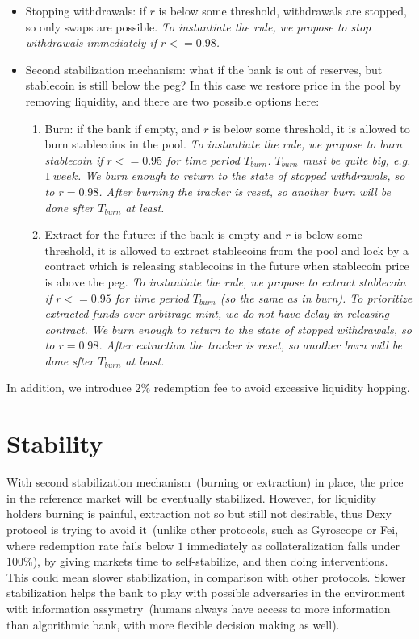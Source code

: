 \documentclass{article}   %
\newcommand{\sct}{stablecoin}
\newcommand{\dx}{Dexy}
\begin{document}
\begin{itemize}
   \item{Stopping withdrawals: } if $r$ is below some threshold, withdrawals are stopped, so only swaps are possible.  
   \em{To instantiate the rule, we propose to stop withdrawals immediately if $r <= 0.98$.}

   \item{Second stabilization mechanism: } what if the bank is out of reserves, but \sct{} is still below the peg? In this case we restore price in the pool by removing liquidity, and there are two possible options here:

   \begin{enumerate}
   \item{Burn: } if the bank if empty, and $r$ is below some threshold, it is allowed to burn \sct{}s in the pool. 
   \em{To instantiate the rule, we propose to burn \sct{} if $r <= 0.95$ for time period $T_{burn}$. $T_{burn}$ must be quite big, e.g. $1 {\ week}$. We burn enough to return to the state of stopped withdrawals, so to $r = 0.98$. After burning the tracker is reset, so another burn will be done sfter $T_{burn}$ at least.}

   \item{Extract for the future: } if the bank is empty and $r$ is below some threshold, it is allowed to extract \sct{}s from the pool and lock by a contract which is releasing \sct{}s in the future when \sct{} price is above the peg.
   \em{To instantiate the rule, we propose to extract \sct{} if $r <= 0.95$ for time period $T_{burn}$ (so the same as in burn). 
   To prioritize extracted funds over arbitrage mint, we do not have delay in releasing contract. We burn enough to return to the state of stopped withdrawals, so to $r = 0.98$. After extraction the tracker is reset, so another burn will be done sfter $T_{burn}$ at least.}
   \end{enumerate}
\end{itemize} 

In addition, we introduce $2\%$ redemption fee to avoid excessive liquidity hopping.

\section{Stability}

With second stabilization mechanism~(burning or extraction) in place, the price in the reference market will be eventually stabilized. However, for liquidity holders burning is painful, extraction not so but still not desirable, thus \dx{} protocol is trying to avoid it~(unlike other protocols, such as Gyroscope or Fei, where redemption rate fails below $1$ immediately as collateralization falls under $100\%$), by giving markets time to self-stabilize, and then doing interventions. This could mean slower stabilization, in comparison with other protocols. Slower stabilization helps the bank to play with possible adversaries in the environment with information assymetry~(humans always have access to more information than algorithmic bank, with more flexible decision making as well).
\end{document}
